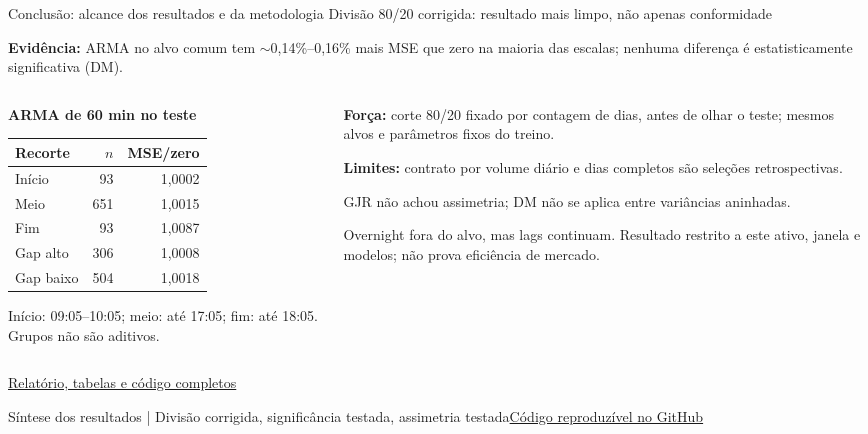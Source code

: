 \documentclass[aspectratio=169,10pt]{beamer}
\newcommand{\source}[2]{\par\vfill{\raggedright\tiny\color{muted}#1\quad\href{#2}{Código reproduzível no GitHub}\par}}
\newcommand{\tagline}[1]{{\small\color{teal}#1}\par\medskip}
\begin{document}
\begin{frame}[t]{Conclusão: alcance dos resultados e da metodologia}
\tagline{Divisão 80/20 corrigida: resultado mais limpo, não apenas conformidade}
\small\textbf{Evidência:} ARMA no alvo comum tem $\sim$0,14\%--0,16\% mais MSE que zero na maioria das escalas; nenhuma diferença é estatisticamente significativa (DM).\par\medskip\begin{columns}[T]\begin{column}{0.50\textwidth}\small\textbf{ARMA de 60 min no teste}\par\smallskip\begin{tabular}{lrr}
\toprule
Recorte & $n$ & MSE/zero \\ \midrule
Início & 93 & 1,0002 \\
Meio & 651 & 1,0015 \\
Fim & 93 & 1,0087 \\
Gap alto & 306 & 1,0008 \\
Gap baixo & 504 & 1,0018 \\
\bottomrule
\end{tabular}\par
\scriptsize Início: 09:05--10:05; meio: até 17:05; fim: até 18:05. Grupos não são aditivos.\end{column}\begin{column}{0.46\textwidth}\small\textbf{Força:} corte 80/20 fixado por contagem de dias, antes de olhar o teste; mesmos alvos e parâmetros fixos do treino.\par\smallskip \textbf{Limites:} contrato por volume diário e dias completos são seleções retrospectivas.\par\smallskip \alert{GJR não achou assimetria; DM não se aplica entre variâncias aninhadas.}\par\smallskip \scriptsize Overnight fora do alvo, mas lags continuam. Resultado restrito a este ativo, janela e modelos; não prova eficiência de mercado.\end{column}\end{columns}\medskip\scriptsize\href{https://github.com/avilarenan/EAD6034/blob/main/results/entrega_28_09}{Relatório, tabelas e código completos}

\source{Síntese dos resultados | Divisão corrigida, significância testada, assimetria testada}{https://github.com/avilarenan/EAD6034/blob/main/src/ead6034/forecast_pipeline.py}
\end{frame}
\end{document}
